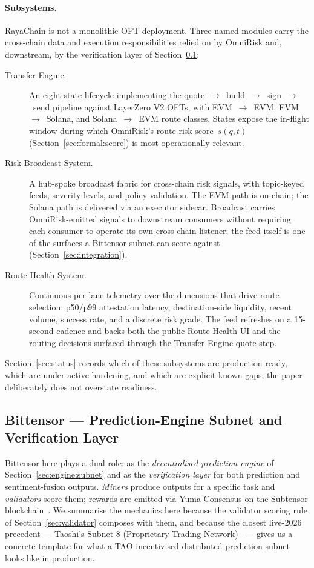 \documentclass[11pt,a4paper]{article}
\begin{document}
\paragraph{Subsystems.} RayaChain is not a monolithic OFT deployment. Three named
modules carry the cross-chain data and execution responsibilities relied on by
OmniRisk and, downstream, by the verification layer of
Section~\ref{sec:arch:bittensor}:
\begin{description}
  \item[Transfer Engine.] An eight-state lifecycle implementing the
        quote~$\to$~build~$\to$~sign~$\to$~send pipeline against LayerZero V2 OFTs,
        with EVM~$\to$~EVM, EVM~$\to$~Solana, and Solana~$\to$~EVM route classes.
        States expose the in-flight window during which OmniRisk's route-risk
        score~$s(q,t)$ (Section~\ref{sec:formal:score}) is most operationally
        relevant.
  \item[Risk Broadcast System.] A hub-spoke broadcast fabric for cross-chain
        risk signals, with topic-keyed feeds, severity levels, and policy
        validation. The EVM path is on-chain; the Solana path is delivered via
        an executor sidecar. Broadcast carries OmniRisk-emitted signals to
        downstream consumers without requiring each consumer to operate its own
        cross-chain listener; the feed itself is one of the surfaces a Bittensor
        subnet can score against (Section~\ref{sec:integration}).
  \item[Route Health System.] Continuous per-lane telemetry over the dimensions
        that drive route selection: p50/p99 attestation latency, destination-side
        liquidity, recent volume, success rate, and a discrete risk grade. The
        feed refreshes on a 15-second cadence and backs both the public Route
        Health UI and the routing decisions surfaced through the Transfer Engine
        quote step.
\end{description}
Section~\ref{sec:status} records which of these subsystems are production-ready,
which are under active hardening, and which are explicit known gaps; the paper
deliberately does not overstate readiness.

\subsection{Bittensor --- Prediction-Engine Subnet and Verification Layer}\label{sec:arch:bittensor}

Bittensor here plays a dual role: as the \emph{decentralised prediction engine} of
Section~\ref{sec:engine:subnet} and as the \emph{verification layer} for both prediction
and sentiment-fusion outputs. \emph{Miners} produce outputs for a specific task and
\emph{validators} score them; rewards are emitted via Yuma Consensus on the Subtensor
blockchain~\cite{rao2021bittensor,steeves2022incentivizing,opentensor2024yuma}. We
summarise the mechanics here because the validator scoring rule of
Section~\ref{sec:validator} composes with them, and because the closest live-2026
precedent --- Taoshi's Subnet 8 (Proprietary Trading Network)~\cite{taoshi2024ptn} ---
gives us a concrete template for what a TAO-incentivised distributed prediction subnet
looks like in production.
\end{document}
